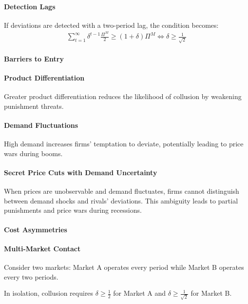 \documentclass[11pt]{elegantbook_2}
\begin{document}
\paragraph*{Detection Lags}
If deviations are detected with a two-period lag, the condition becomes:
\begin{equation}
    \begin{aligned}
        \sum_{t=1}^\infty\delta^{t-1}\frac{\Pi^M}{2}\geq (1+\delta)\Pi^M
        \Leftrightarrow \delta\geq \frac{1}{\sqrt{2}}
    \end{aligned}
    \nonumber
\end{equation}

\paragraph*{Barriers to Entry}

\paragraph*{Product Differentiation} Greater product differentiation reduces the likelihood of collusion by weakening punishment threats.

\paragraph*{Demand Fluctuations}
High demand increases firms' temptation to deviate, potentially leading to price wars during booms.

\paragraph*{Secret Price Cuts with Demand Uncertainty} When prices are unobservable and demand fluctuates, firms cannot distinguish between demand shocks and rivals' deviations. This ambiguity leads to partial punishments and price wars during recessions.

\paragraph*{Cost Asymmetries}

\paragraph*{Multi-Market Contact}
Consider two markets: Market A operates every period while Market B operates every two periods.

In isolation, collusion requires $\delta\geq \frac{1}{2}$ for Market A and $\delta\geq \frac{1}{\sqrt{2}}$ for Market B.
\end{document}
